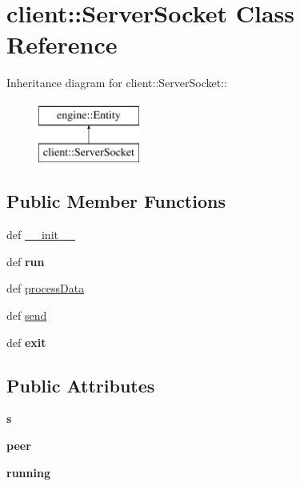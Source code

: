 \hypertarget{classclient_1_1ServerSocket}{
\section{client::ServerSocket Class Reference}
\label{classclient_1_1ServerSocket}
}
Inheritance diagram for client::ServerSocket::\begin{figure}[H]
\begin{center}
\leavevmode
\includegraphics[height=2cm]{classclient_1_1ServerSocket}
\end{center}
\end{figure}
\subsection*{Public Member Functions}
\begin{DoxyCompactItemize}
\item 
def \hyperlink{classclient_1_1ServerSocket_afd17124d2bc0b88553a4f64e17214d9f}{\_\-\_\-init\_\-\_\-}
\item 
\hypertarget{classclient_1_1ServerSocket_a016b440f33c369356daf48d9c0f13c07}{
def {\bfseries run}}
\label{classclient_1_1ServerSocket_a016b440f33c369356daf48d9c0f13c07}

\item 
def \hyperlink{classclient_1_1ServerSocket_a1f01d7e9cdd9b697cb5e6baa95678493}{processData}
\item 
def \hyperlink{classclient_1_1ServerSocket_aca5718bbcca5e3ac2b1fd55e557ae594}{send}
\item 
\hypertarget{classclient_1_1ServerSocket_ad462248b0d34a02c3aa48724ba7685c6}{
def {\bfseries exit}}
\label{classclient_1_1ServerSocket_ad462248b0d34a02c3aa48724ba7685c6}

\end{DoxyCompactItemize}
\subsection*{Public Attributes}
\begin{DoxyCompactItemize}
\item 
\hypertarget{classclient_1_1ServerSocket_a7898598b59dec9d4a5dbbe7f8b39888c}{
{\bfseries s}}
\label{classclient_1_1ServerSocket_a7898598b59dec9d4a5dbbe7f8b39888c}

\item 
\hypertarget{classclient_1_1ServerSocket_ab56f43f08867a77a97fc015b9c6f42af}{
{\bfseries peer}}
\label{classclient_1_1ServerSocket_ab56f43f08867a77a97fc015b9c6f42af}

\item 
\hypertarget{classclient_1_1ServerSocket_a8e775de68e25349ac35e28174af5d303}{
{\bfseries running}}
\label{classclient_1_1ServerSocket_a8e775de68e25349ac35e28174af5d303}

\end{DoxyCompactItemize}



